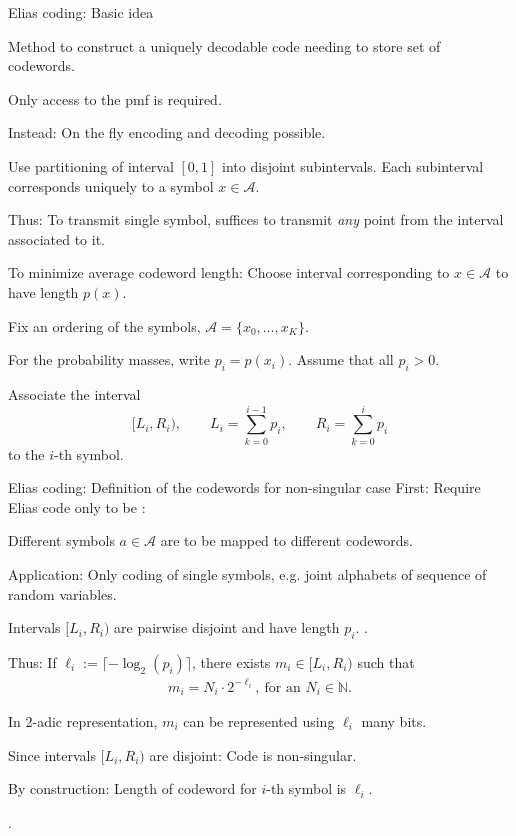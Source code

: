 \begin{frame}{Elias coding: Basic idea}
\bit 
\item Method to construct a uniquely decodable code  needing to store set of codewords.
\item Only access to the pmf is required. 
\item Instead: On the fly encoding and decoding possible.
\item {} Use partitioning of interval $[0,1]$ into disjoint subintervals. Each subinterval corresponds 
uniquely to a symbol $x\in\mathcal{A}$. 
\item [\iarrow] Thus: To transmit single symbol, suffices to transmit \textit{any} point from the interval associated to it.  
\item To minimize average codeword length: Choose interval corresponding to $x\in\mathcal{A}$ to have length $p(x)$. 
\eit
\vspace{-0.1cm}
\bit
\item Fix an ordering of the symbols, $\mathcal{A}=\{x_0,\dots,x_K\}$.
\item For the probability masses, write $p_i=p(x_i)$. Assume that all $p_i>0$.   
\item Associate the interval
\[
[L_i,R_i), \qquad L_i=\sum_{k=0}^{i-1}p_i,\qquad R_i=\sum_{k=0}^{i}p_i
\] 
to the $i$-th symbol. 
\eit
\end{frame}


\begin{frame}{Elias coding: Definition of the codewords for non-singular case}
First: Require Elias code only to be : 
\bit %
\item Different symbols $a\in\mathcal{A}$ are to be mapped to different codewords. 
\item Application: Only coding of single symbols, e.g. joint alphabets of sequence of random variables.
\eit
\vspace{-0.1cm}
\bit
\item Intervals $[L_i,R_i)$ are pairwise disjoint and have length $p_i$. .
\item Thus: If  ${\ell}_i:=\lceil-\log_2(p_i)\rceil$,
there exists $m_i\in [L_i,R_i)$ such that 
\begin{align}\label{Propm}
m_i=N_i\cdot 2^{-\ell_i},\: \text{for an $N_i\in\mathbb{N}$}.
\end{align}  
\item In 2-adic representation, $m_i$ can be represented using ${\ell}_i$ many bits.
\item[\iarrow]
\item Since intervals $[L_i,R_i)$ are disjoint: Code is non-singular.
\item By construction: Length of codeword for $i$-th symbol is $\ell_i$.
\item[\iarrow] . 
\eit 

\end{frame}


